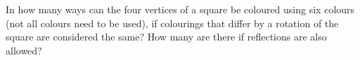 In how many ways can the four vertices of a square be coloured using six colours (not all colours need to be used), if colourings that differ by a rotation of the square are considered the same? How many are there if reflections are also allowed?
